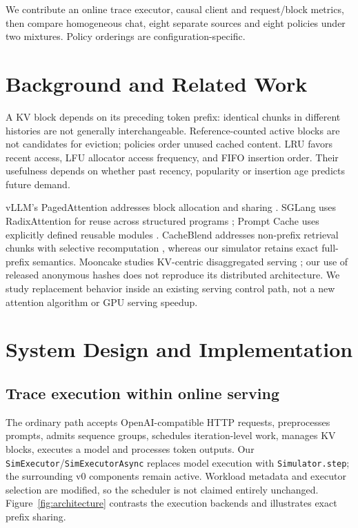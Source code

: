 \documentclass{article}
\begin{document}
We contribute an online trace executor, causal client and request/block metrics, then compare homogeneous chat, eight separate sources and eight policies under two mixtures. Policy orderings are configuration-specific.

\section{Background and Related Work}
A KV block depends on its preceding token prefix: identical chunks in different histories are not generally interchangeable. Reference-counted active blocks are not candidates for eviction; policies order unused cached content. LRU favors recent access, LFU allocator access frequency, and FIFO insertion order. Their usefulness depends on whether past recency, popularity or insertion age predicts future demand.

vLLM's PagedAttention addresses block allocation and sharing \citep{kwon2023}. SGLang uses RadixAttention for reuse across structured programs \citep{sglang}; Prompt Cache uses explicitly defined reusable modules \citep{promptcache}. CacheBlend addresses non-prefix retrieval chunks with selective recomputation \citep{cacheblend}, whereas our simulator retains exact full-prefix semantics. Mooncake studies KV-centric disaggregated serving \citep{mooncakepaper}; our use of released anonymous hashes does not reproduce its distributed architecture. We study replacement behavior inside an existing serving control path, not a new attention algorithm or GPU serving speedup.

\section{System Design and Implementation}
\subsection{Trace execution within online serving}
The ordinary path accepts OpenAI-compatible HTTP requests, preprocesses prompts, admits sequence groups, schedules iteration-level work, manages KV blocks, executes a model and processes token outputs. Our \texttt{SimExecutor}/\texttt{SimExecutorAsync} replaces model execution with \texttt{Simulator.step}; the surrounding v0 components remain active. Workload metadata and executor selection are modified, so the scheduler is not claimed entirely unchanged. Figure~\ref{fig:architecture} contrasts the execution backends and illustrates exact prefix sharing.
\end{document}
